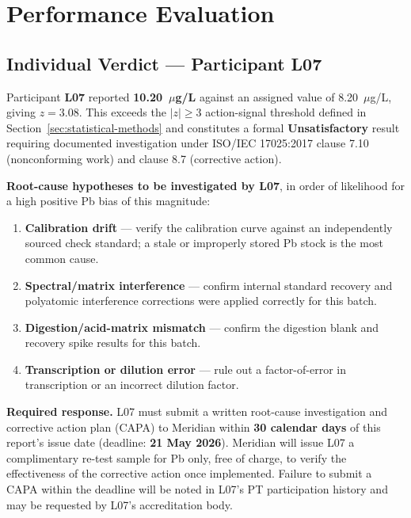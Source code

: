 \section{Performance Evaluation}
\label{sec:performance-evaluation}

\subsection{Individual Verdict --- Participant L07}

\begin{tcolorbox}[critbox, title={\faTimesCircle\ Performance Verdict: UNSATISFACTORY (Lead, Pb)}]
Participant \textbf{L07} reported \textbf{10.20~\(\mu\)g/L} against an assigned value of
8.20~\(\mu\)g/L, giving \(z = 3.08\). This exceeds the \(|z| \geq 3\) action-signal threshold
defined in Section~\ref{sec:statistical-methods} and constitutes a formal \textbf{Unsatisfactory}
result requiring documented investigation under ISO/IEC 17025:2017 clause 7.10 (nonconforming
work) and clause 8.7 (corrective action).
\end{tcolorbox}

\vspace{0.4em}
\noindent\textbf{Root-cause hypotheses to be investigated by L07}, in order of likelihood for a
high positive Pb bias of this magnitude:

\begin{enumerate}
  \item \textbf{Calibration drift} --- verify the calibration curve against an independently
        sourced check standard; a stale or improperly stored Pb stock is the most common cause.
  \item \textbf{Spectral/matrix interference} --- confirm internal standard recovery and
        polyatomic interference corrections were applied correctly for this batch.
  \item \textbf{Digestion/acid-matrix mismatch} --- confirm the digestion blank and recovery
        spike results for this batch.
  \item \textbf{Transcription or dilution error} --- rule out a factor-of-error in transcription
        or an incorrect dilution factor.
\end{enumerate}

\noindent\textbf{Required response.} L07 must submit a written root-cause investigation and
corrective action plan (CAPA) to Meridian within \textbf{30 calendar days} of this report's issue
date (deadline: \textbf{21 May 2026}). Meridian will issue L07 a complimentary re-test sample for
Pb only, free of charge, to verify the effectiveness of the corrective action once implemented.
Failure to submit a CAPA within the deadline will be noted in L07's PT participation history and
may be requested by L07's accreditation body.

